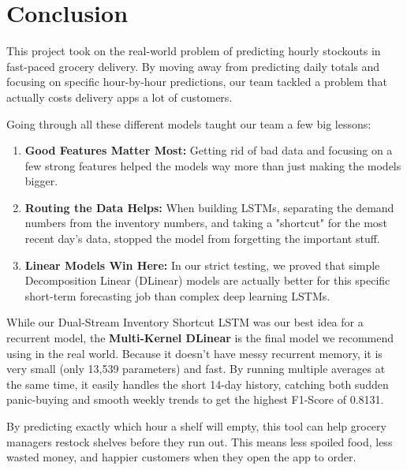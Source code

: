 \section{Conclusion}

This project took on the real-world problem of predicting hourly stockouts in fast-paced grocery delivery. By moving away from predicting daily totals and focusing on specific hour-by-hour predictions, our team tackled a problem that actually costs delivery apps a lot of customers.

Going through all these different models taught our team a few big lessons:

\begin{enumerate}
    \item \textbf{Good Features Matter Most:} Getting rid of bad data and focusing on a few strong features helped the models way more than just making the models bigger.
    \item \textbf{Routing the Data Helps:} When building LSTMs, separating the demand numbers from the inventory numbers, and taking a "shortcut" for the most recent day's data, stopped the model from forgetting the important stuff.
    \item \textbf{Linear Models Win Here:} In our strict testing, we proved that simple Decomposition Linear (DLinear) models are actually better for this specific short-term forecasting job than complex deep learning LSTMs.
\end{enumerate}

While our Dual-Stream Inventory Shortcut LSTM was our best idea for a recurrent model, the \textbf{Multi-Kernel DLinear} is the final model we recommend using in the real world. Because it doesn't have messy recurrent memory, it is very small (only 13,539 parameters) and fast. By running multiple averages at the same time, it easily handles the short 14-day history, catching both sudden panic-buying and smooth weekly trends to get the highest F1-Score of 0.8131. 

By predicting exactly which hour a shelf will empty, this tool can help grocery managers restock shelves before they run out. This means less spoiled food, less wasted money, and happier customers when they open the app to order.
